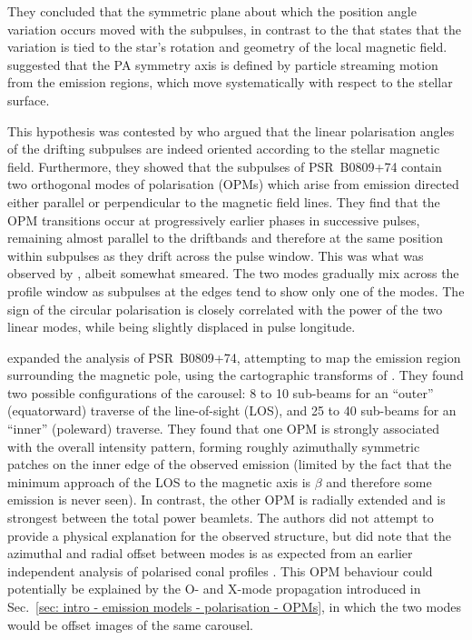 They concluded that the symmetric plane about which the position angle variation occurs moved with the subpulses, in contrast to the \citep{RCxx1969} that states that the variation is tied to the star's rotation and geometry of the local magnetic field. \citet{THHM1971} suggested that the PA symmetry axis is defined by particle streaming motion from the emission regions, which move systematically with respect to the stellar surface.

This hypothesis was contested by \citet{RRS+2002} who argued that the linear polarisation angles of the drifting subpulses are indeed oriented according to the stellar magnetic field. Furthermore, they showed that the subpulses of PSR~B0809+74 contain two orthogonal modes of polarisation (OPMs) which arise from emission directed either parallel or perpendicular to the magnetic field lines. They find that the OPM transitions occur at progressively earlier phases in successive pulses, remaining almost parallel to the driftbands and therefore at the same position within subpulses as they drift across the pulse window. This was what was observed by \citet{THHM1971}, albeit somewhat smeared. The two modes gradually mix across the profile window as subpulses at the edges tend to show only one of the modes. The sign of the circular polarisation is closely correlated with the power of the two linear modes, while being slightly displaced in pulse longitude.

\citet{RRL+2006} expanded the analysis of PSR~B0809+74, attempting to map the emission region surrounding the magnetic pole, using the cartographic transforms of \citet[][see Appendix~\ref{app: geometry derivations}]{DRxx2001}. They found two possible configurations of the carousel: 8 to 10 sub-beams for an ``outer'' (equatorward) traverse of the line-of-sight (LOS), and 25 to 40 sub-beams for an ``inner'' (poleward) traverse. They found that one OPM is strongly associated with the overall intensity pattern, forming roughly azimuthally symmetric patches on the inner edge of the observed emission (limited by the fact that the minimum approach of the LOS to the magnetic axis is $\beta$ and therefore some emission is never seen). In contrast, the other OPM is radially extended and is strongest between the total power beamlets. The authors did not attempt to provide a physical explanation for the observed structure, but did note that the azimuthal and radial offset between modes is as expected from an earlier independent analysis of polarised conal profiles \citep{RRxx2003}. This OPM behaviour could potentially be explained by the O- and X-mode propagation introduced in Sec.~\ref{sec: intro - emission models - polarisation - OPMs}, in which the two modes would be offset images of the same carousel.



